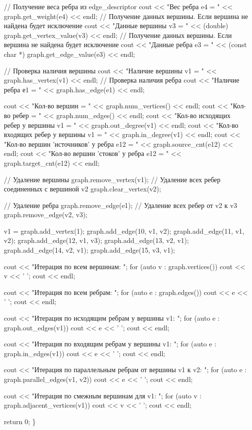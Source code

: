 \begin{DoxyCode}
    // Получение веса ребра из edge\_descriptor
    cout << "Вес ребра e4 = " << graph.get\_weight(e4) << endl;
    // Получение данных вершины. Если вершина не найдена будет исключение
    cout << "Данные вершины v3 = " << (double) graph.get\_vertex\_value(v3) << endl;
    // Получение данных вершины. Если вершина не найдена будет исключение
    cout << "Данные ребра e3 = " << (const char *) graph.get\_edge\_value(e3) << endl;

    // Проверка наличия вершины
    cout << "Наличие вершины v1 = " << graph.has\_vertex(v1) << endl;
    // Проверка наличия ребра
    cout << "Наличие ребра е1 = " << graph.has\_edge(e1) << endl;

    cout << "Кол-во вершин = " << graph.num\_vertices() << endl;
    cout << "Кол-во ребер = " << graph.num\_edges() << endl;
    cout << "Кол-во исходящих ребер у вершины v1 = " << graph.out\_degree(v1) << endl;
    cout << "Кол-во входящих ребер у вершины v1 = " << graph.in\_degree(v1) << endl;
    cout << "Кол-во вершин 'источников' у ребра e12 = " << graph.source\_cnt(e12) << endl;
    cout << "Кол-во вершин 'стоков' у ребра e12 = " << graph.target\_cnt(e12) << endl;


    // Удаление вершины
    graph.remove\_vertex(v1);
    // Удаление всех ребер соединенных с вершиной v2
    graph.clear\_vertex(v2);

    // Удаление ребра
    graph.remove\_edge(e1);
    // Удаление всех ребер от v2 к v3
    graph.remove\_edge(v2, v3);


    v1 = graph.add\_vertex(1);
    graph.add\_edge(10, v1, v2);
    graph.add\_edge(11, v1, v2);
    graph.add\_edge(12, v1, v3);
    graph.add\_edge(13, v2, v1);
    graph.add\_edge(14, v2, v1);
    graph.add\_edge(15, v3, v1);

    cout << "Итерация по всем вершинам: ";
    for (auto v : graph.vertices())
        cout << v <<  ' ';
    cout << endl;

    cout << "Итерация по всем ребрам: ";
    for (auto e : graph.edges())
        cout << e <<  ' ';
    cout << endl;

    cout << "Итерация по исходящим ребрам у вершины v1: ";
    for (auto e : graph.out\_edges(v1))
        cout << e <<  ' ';
    cout << endl;

    cout << "Итерация по входящим ребрам у вершины v1: ";
    for (auto e : graph.in\_edges(v1))
        cout << e <<  ' ';
    cout << endl;

    cout << "Итерация по параллельным ребрам от вершины v1 к v2: ";
    for (auto e : graph.parallel\_edges(v1, v2))
        cout << e <<  ' ';
    cout << endl;

    cout << "Итерация по смежным вершинам для v1: ";
    for (auto v : graph.adjacent\_vertices(v1))
        cout << v <<  ' ';
    cout << endl;

    return 0;
\}
\end{DoxyCode}
 